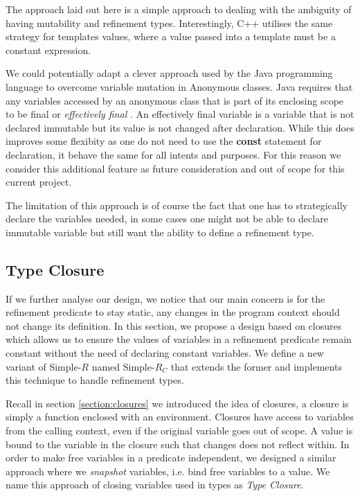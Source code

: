 \documentclass[a4paper,12pt]{report}
\begin{document}
\par
The approach laid out here is a simple approach to dealing with the ambiguity of 
having mutability and refinement types. Interestingly, C++ utilises the same 
strategy for templates values, where a value passed into a template must be a 
constant expression. 

\par
We could potentially adapt a clever approach used by the Java programming 
language to overcome variable mutation in Anonymous classes. Java requires that 
any variables accessed by an anonymous class that is part of 
its enclosing scope to be final or \textit{effectively final} 
\cite{effectFinal}. An effectively final variable is a variable that is not 
declared immutable but its value is not changed after declaration. While this 
does improves some flexibity as one do not need to use the \textbf{const} 
statement for declaration, it behave the same for all intents and purposes. 
For this reason we consider this additional feature as future consideration and 
out of scope for this current project. 

\par
The limitation of this approach is of course the fact that one has to strategically 
declare the variables needed, in some cases one might not be able to declare 
immutable variable but still want the ability to define a refinement type.

\subsection{Type Closure}
If we further analyse our design, we notice that our main concern is for the 
refinement predicate to stay static, any changes in the program context should 
not change its definition. In this section, we propose a design based on closures 
which allows us to ensure the values of variables in a refinement predicate remain 
constant without the need of declaring constant variables. We define a new variant of 
Simple-$R$ named Simple-$R_{C}$ that extends the former and implements this 
technique to handle refinement types. 

\par
Recall in section \ref{section:closures} we introduced the idea of closures, a 
closure is simply a function enclosed with an environment. Closures have access to 
variables from the calling context, even if the original variable goes out of 
scope. A value is bound to the variable in the closure such that changes does 
not reflect within. In order to make free variables in a predicate independent, 
we designed a similar approach where we \emph{snapshot} variables, i.e. 
bind free variables to a value. We name this approach of closing 
variables used in types as \emph{Type Closure}.
\end{document}
